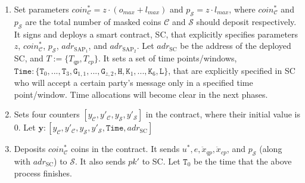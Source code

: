 \begin{enumerate}
\begin{enumerate}
\item Set parameters  $coin^{\scriptscriptstyle *}_{\scriptscriptstyle\mathcal C}=z\cdot (o_{\scriptscriptstyle max}+l_{\scriptscriptstyle max})$ and $p_{\scriptscriptstyle\mathcal{S}}=z\cdot l_{\scriptscriptstyle max}$, where $coin^{\scriptscriptstyle *}_{\scriptscriptstyle\mathcal C}$ and $p_{\scriptscriptstyle\mathcal{S}}$ are   the total number of masked coins $\mathcal C$ and $\mathcal S$ should deposit respectively. It signs and deploys a smart contract, SC, that explicitly specifies  parameters $z$,  $coin^{\scriptscriptstyle *}_{\scriptscriptstyle\mathcal C}$, $p_{\scriptscriptstyle\mathcal{S}}$,  $adr_{\scriptscriptstyle\text{SAP}_{\scriptscriptstyle 1}}$, and $adr_{\scriptscriptstyle\text{SAP}_{\scriptscriptstyle 2}}$. Let $adr_{\scriptscriptstyle \text{SC}}$ be the address of the deployed SC, and $T:=\{T_{\scriptscriptstyle qp},T_{\scriptscriptstyle cp}\}$. It sets a set of time points/windows, $\texttt{Time}:\{ \texttt{T}_{\scriptscriptstyle 0},..., \texttt{T}_{\scriptscriptstyle 3},\texttt{G}_{\scriptscriptstyle 1,1},...,\texttt{G}_{\scriptscriptstyle z,2},\texttt{H}, \texttt{K}_{\scriptscriptstyle 1},...,\texttt{K}_{\scriptscriptstyle 6}, \texttt{L}\}$, that are explicitly specified in SC who will accept a certain party's message only in a specified  time point/window. Time allocations will become clear in the next phases. 


\item\label{setcounters} Sets four counters $[y_{\scriptscriptstyle\mathcal C},y'_{\scriptscriptstyle\mathcal C},y_{\scriptscriptstyle\mathcal S},  y'_{\scriptscriptstyle\mathcal S}]$ in the contract, where their initial value is $0$. Let $\bm{y}: [y_{\scriptscriptstyle\mathcal C},y'_{\scriptscriptstyle\mathcal C},y_{\scriptscriptstyle\mathcal S},  y'_{\scriptscriptstyle\mathcal S},\texttt{Time},adr_{\scriptscriptstyle \text{SC}}]$

\item Deposits $coin^{\scriptscriptstyle *}_{\scriptscriptstyle\mathcal C}$ coins in the contract. It  sends $u^{\scriptscriptstyle *}, e, \ddot{x}_{\scriptscriptstyle qp},\ddot{x}_{\scriptscriptstyle cp}$, and $p_{\scriptscriptstyle\mathcal{S}}$ (along with $adr_{\scriptscriptstyle \text{SC}}$) to $\mathcal S$. It also sends  $pk'$ to SC. Let $\texttt{T}_{\scriptscriptstyle 0}$ be the time that the above process finishes. 




\end{enumerate}
\end{enumerate}
